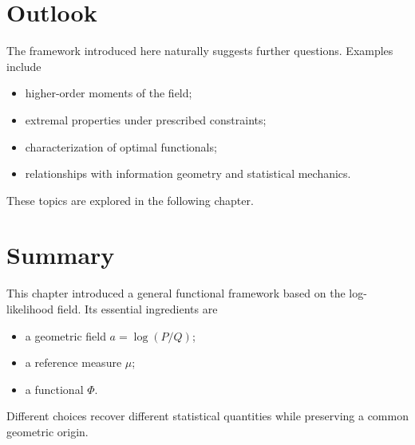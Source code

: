 \section{Outlook}
The framework introduced here naturally suggests further questions.
Examples include
\begin{itemize}
  \item higher-order moments of the field;
  \item extremal properties under prescribed constraints;
  \item characterization of optimal functionals;
  \item relationships with information geometry and statistical mechanics.
\end{itemize}
These topics are explored in the following chapter.
\section{Summary}
This chapter introduced a general functional framework based on the
log-likelihood field.
Its essential ingredients are
\begin{itemize}
  \item a geometric field \(a=\log(P/Q)\);
  \item a reference measure \(\mu\);
  \item a functional \(\Phi\).
\end{itemize}
Different choices recover different statistical quantities while
preserving a common geometric origin.
